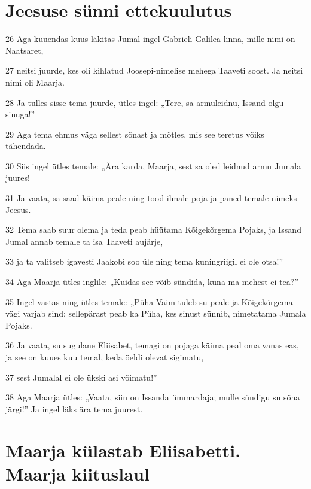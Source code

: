 \section*{Jeesuse sünni ettekuulutus}

\par 26 Aga kuuendas kuus läkitas Jumal ingel Gabrieli Galilea linna, mille nimi on Naatsaret,
\par 27 neitsi juurde, kes oli kihlatud Joosepi-nimelise mehega Taaveti soost. Ja neitsi nimi oli Maarja.
\par 28 Ja tulles sisse tema juurde, ütles ingel: „Tere, sa armuleidnu, Issand olgu sinuga!”
\par 29 Aga tema ehmus väga sellest sõnast ja mõtles, mis see teretus võiks tähendada.
\par 30 Siis ingel ütles temale: „Ära karda, Maarja, sest sa oled leidnud armu Jumala juures!
\par 31 Ja vaata, sa saad käima peale ning tood ilmale poja ja paned temale nimeks Jeesus.
\par 32 Tema saab suur olema ja teda peab hüütama Kõigekõrgema Pojaks, ja Issand Jumal annab temale ta isa Taaveti aujärje,
\par 33 ja ta valitseb igavesti Jaakobi soo üle ning tema kuningriigil ei ole otsa!”
\par 34 Aga Maarja ütles inglile: „Kuidas see võib sündida, kuna ma mehest ei tea?”
\par 35 Ingel vastas ning ütles temale: „Püha Vaim tuleb su peale ja Kõigekõrgema vägi varjab sind; sellepärast peab ka Püha, kes sinust sünnib, nimetatama Jumala Pojaks.
\par 36 Ja vaata, su sugulane Eliisabet, temagi on pojaga käima peal oma vanas eas, ja see on kuues kuu temal, keda öeldi olevat sigimatu,
\par 37 sest Jumalal ei ole ükski asi võimatu!”
\par 38 Aga Maarja ütles: „Vaata, siin on Issanda ümmardaja; mulle sündigu su sõna järgi!” Ja ingel läks ära tema juurest.

\section*{Maarja külastab Eliisabetti. Maarja kiituslaul}

